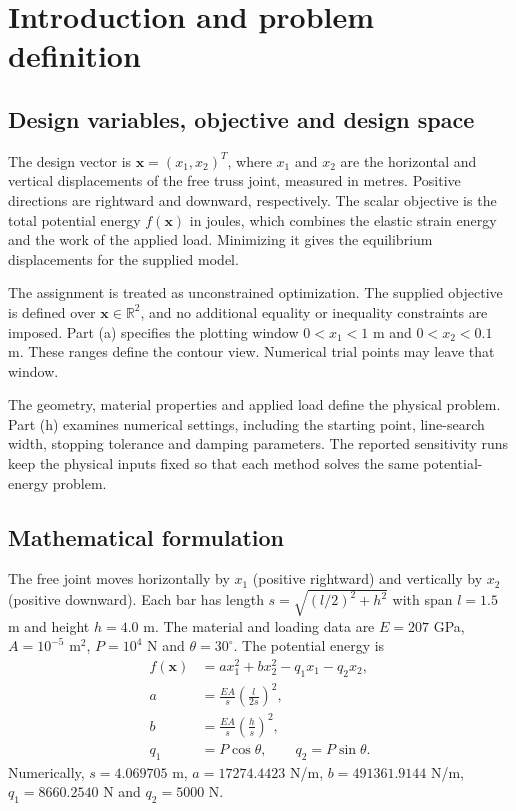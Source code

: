 \documentclass[11pt,a4paper]{article}
\begin{document}
\section{Introduction and problem definition}
\subsection{Design variables, objective and design space}
The design vector is $\bm x=(x_1,x_2)^T$, where $x_1$ and $x_2$ are
the horizontal and vertical displacements of the free truss joint, measured
in metres. Positive directions are rightward and downward, respectively.
The scalar objective is the total potential energy $f(\bm x)$ in joules,
which combines the elastic strain energy and the work of the applied load.
Minimizing it gives the equilibrium displacements for the supplied model.

The assignment is treated as unconstrained optimization. The supplied
objective is defined over $\bm x\in\mathbb R^2$, and no additional equality
or inequality constraints are imposed. Part (a) specifies the plotting
window $0<x_1<1$ m and $0<x_2<0.1$ m. These ranges define the contour
view. Numerical trial points may leave that window.

The geometry, material properties and applied load define the physical
problem. Part (h) examines numerical settings, including the starting point,
line-search width, stopping tolerance and damping parameters. The reported
sensitivity runs keep the physical inputs fixed so that each method solves
the same potential-energy problem.

\subsection{Mathematical formulation}
The free joint moves horizontally by $x_1$ (positive rightward) and vertically by
$x_2$ (positive downward). Each bar has length $s=\sqrt{(l/2)^2+h^2}$
with span $l=1.5$ m and height $h=4.0$ m. The material and loading data
are $E=207$ GPa, $A=10^{-5}$ m$^2$, $P=10^4$ N and $\theta=30^\circ$.
The potential energy is
\begin{align}
 f(\bm x)&=a x_1^2+b x_2^2-q_1 x_1-q_2 x_2,\\
 a&=\frac{EA}{s}\left(\frac{l}{2s}\right)^2,\\
 b&=\frac{EA}{s}\left(\frac{h}{s}\right)^2,\\
 q_1&=P\cos\theta,\qquad q_2=P\sin\theta.
\end{align}
Numerically, $s=4.069705$ m, $a=17274.4423$ N/m, $b=491361.9144$ N/m,
$q_1=8660.2540$ N and $q_2=5000$ N.
\end{document}

